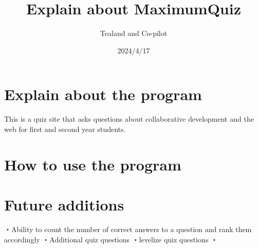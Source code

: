 \documentclass{article}
\title{Explain about MaximumQuiz}  ここでは日本語は表示されなくなる
\author{Tealand and Co-pilot}
\date{2024/4/17}
\begin{document}
\maketitle

\section{Explain about the program}

This is a quiz site that asks questions about collaborative development and the web for first and second year students.

\section{How to use the program}


\section{Future additions}
・Ability to count the number of correct answers to a question and rank them accordingly
・Additional quiz questions
・levelize quiz questions
・
\end{document}
